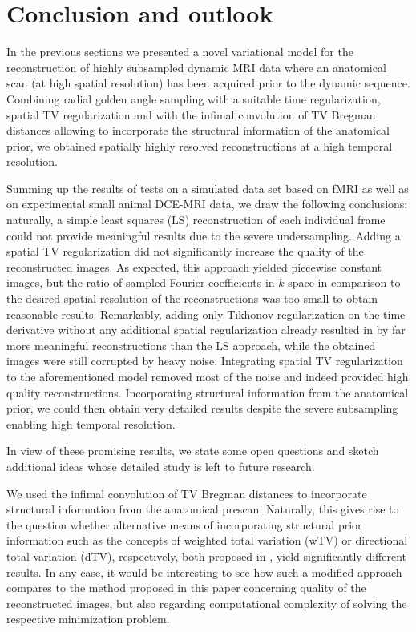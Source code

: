 \section{Conclusion and outlook}
\label{sec:outlook}
In the previous sections we presented a novel variational model for the reconstruction of highly subsampled dynamic MRI data where an anatomical scan (at high spatial resolution) has been acquired prior to the dynamic sequence. 
Combining radial golden angle sampling with a suitable time regularization, spatial TV regularization and with the infimal convolution of TV Bregman distances allowing to incorporate the structural information of the anatomical prior, we obtained spatially highly resolved reconstructions at a high temporal resolution. 

Summing up the results of tests on a simulated data set based on fMRI as well as on experimental small animal DCE-MRI data, we draw the following conclusions:
naturally, a simple least squares (LS) reconstruction of each individual frame could not provide meaningful results due to the severe undersampling. 
Adding a spatial TV regularization did not significantly increase the quality of the reconstructed images. 
As expected, this approach yielded piecewise constant images, but the ratio of sampled Fourier coefficients in $k$-space in comparison to the desired spatial resolution of the reconstructions was too small to obtain reasonable results. 
Remarkably, adding only Tikhonov regularization on the time derivative without any additional spatial regularization already resulted in by far more meaningful reconstructions than the LS approach, while the obtained images were still corrupted by heavy noise.
Integrating spatial TV regularization to the aforementioned model removed most of the noise and indeed provided high quality reconstructions. 
Incorporating structural information from the anatomical prior, we could then obtain very detailed results despite the severe subsampling enabling high temporal resolution.

In view of these promising results, we state some open questions and sketch additional ideas whose detailed study is left to future research.

We used the infimal convolution of TV Bregman distances to incorporate structural information from the anatomical prescan. 
Naturally, this gives rise to the question whether alternative means of incorporating structural prior information such as the concepts of weighted total variation (wTV) or directional total variation (dTV), respectively, both proposed in \cite{Ehrhardt2016}, yield significantly different results. 
In any case, it would be interesting to see how such a modified approach compares to the method proposed in this paper concerning quality of the reconstructed images, but also regarding computational complexity of solving the respective minimization problem. 

